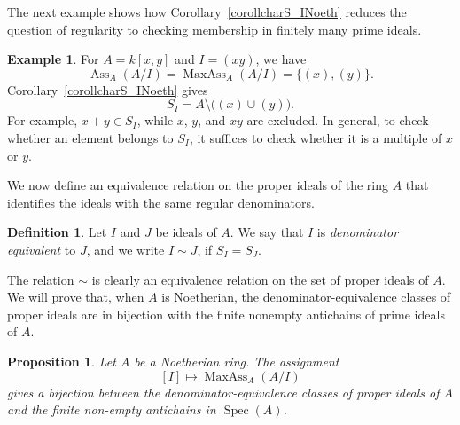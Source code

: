 \documentclass[11pt,leqno]{amsart}
\newtheorem{proposition}[theorem]{Proposition}
\theoremstyle{definition}
\newtheorem{definition}{Definition}[section]
\newtheorem{example}[theorem]{Example}
\numberwithin{equation}{section}
\DeclareMathOperator{\Spec}{Spec}
\DeclareMathOperator{\Ass}{Ass}
\DeclareMathOperator{\MaxAss}{MaxAss}
\begin{document}
The next example shows how Corollary~\ref{corollcharS_INoeth} reduces the question of regularity to checking membership in finitely many prime ideals.

\begin{example}
For $A=k[x,y]$ and $I=(xy)$, we have
\[
\Ass_A(A/I)=\MaxAss_A(A/I)=\{(x),(y)\}.
\]
Corollary~\ref{corollcharS_INoeth} gives
\[
S_I=A\setminus\bigl((x)\cup(y)\bigr).
\]
For example, $x+y\in S_I$, while $x$, $y$, and $xy$ are excluded. In general, to check whether an element belongs to $S_I$, it suffices to check whether it is a multiple of $x$ or $y$.  
\end{example}

We now define an equivalence relation on the proper ideals of the ring $A$ that identifies the ideals with the same regular denominators.

\begin{definition}
    Let $I$ and $J$ be ideals of $A$. We say that $I$ is \emph{denominator equivalent} to $J$, and we write $I \sim J$, if $S_I=S_J$.  
\end{definition}

The relation $\sim$ is clearly an equivalence relation on the set of proper ideals of $A$. We will prove that, when $A$ is Noetherian, the denominator-equivalence classes of proper ideals are in bijection with the finite nonempty antichains of prime ideals of $A$.

\begin{proposition}
\label{propdeneqantich}
Let $A$ be a Noetherian ring. 
The assignment 
$$[I]\longmapsto\MaxAss_A(A/I)$$
gives a bijection between the denominator-equivalence classes of proper ideals of $A$ and the finite non-empty antichains in $\Spec(A)$. 
\end{proposition}
\end{document}
